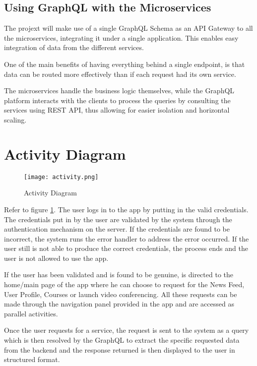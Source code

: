 \subsection{Using GraphQL with the Microservices}

The projext will make use of a single GraphQL Schema as an API Gateway to all the microservices, 
integrating it under a single application. This enables easy integration of data from the different services.

One of the main benefits of having everything behind a single endpoint, is that data can be routed more 
effectively than if each request had its own service. 

The microservices handle the business logic themselves, while the GraphQL platform interacts with the 
clients to process the queries by consulting the services using REST API, thus allowing for easier isolation 
and horizontal scaling.

\section{Activity Diagram}

\begin{figure}[h!]
    \begin{center}
        \texttt{[image: activity.png]}
    \end{center}
    \caption{Activity Diagram}
    \label{fig:activity}
\end{figure}

Refer to figure \ref{fig:activity}. The user logs in to the app by putting in the valid credentials.
The credentials put in by the user are validated by the system through the authentication mechanism on the server.
If the credentials are found to be incorrect, the system runs the error handler to address the error occurred.
If the user still is not able to produce the correct credentials, the process ends and the user is not allowed to use the app.

If the user has been validated and is found to be genuine, is directed to the home/main page of the app where he can choose to request for the News Feed, User Profile, Courses or launch video conferencing.
All these requests can be made through the navigation panel provided in the app and are accessed as parallel activities.

Once the user requests for a service, the request is sent to the system as a query which is then resolved by the GraphQL to extract the specific requested data from the backend and the response returned is then displayed to the user in structured format.

